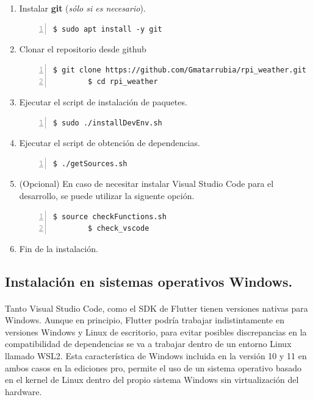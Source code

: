 \begin{enumerate}
    \item Instalar \textbf{\gls{git}} (\emph{sólo si es necesario}).
    \begin{lstlisting}[style=consola, numbers=left]
        $ sudo apt install -y git
    \end{lstlisting}

    \item Clonar el repositorio desde github
    \begin{lstlisting}[style=consola, numbers=left]
        $ git clone https://github.com/Gmatarrubia/rpi_weather.git
        $ cd rpi_weather
    \end{lstlisting}

    \item Ejecutar el script de instalación de paquetes.
    \begin{lstlisting}[style=consola, numbers=left]
        $ sudo ./installDevEnv.sh
    \end{lstlisting}

    \item Ejecutar el script de obtención de dependencias.
    \begin{lstlisting}[style=consola, numbers=left]
        $ ./getSources.sh
    \end{lstlisting}

    \item (Opcional) En caso de necesitar instalar Visual Studio Code para el desarrollo,
    se puede utilizar la siguente opción.
    \begin{lstlisting}[style=consola, numbers=left]
        $ source checkFunctions.sh
        $ check_vscode
    \end{lstlisting}

    \item Fin de la instalación.
\end{enumerate}

\subsection{Instalación en sistemas operativos Windows.}\label{sec:install_win_flutter}

\paragraph{}Tanto Visual Studio Code, como el \gls{SDK} de Flutter tienen versiones
nativas para Windows. Aunque en principio, Flutter podría trabajar indistintamente en
versiones Windows y Linux de escritorio, para evitar posibles discrepancias en la
compatibilidad de dependencias se va a trabajar dentro de un entorno Linux llamado
\gls{WSL2}. Esta característica de Windows incluida en la versión 10 y 11 en ambos
casos en la ediciones pro, permite el uso de un sistema operativo basado en el kernel
de Linux dentro del propio sistema Windows sin virtualización del hardware.


